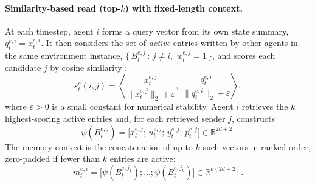 \documentclass{article}
\theoremstyle{plain}
\theoremstyle{definition}
\theoremstyle{remark}
\begin{document}

\paragraph{Similarity-based read (top-$k$) with fixed-length context.} At each timestep, agent $i$ forms a query vector from its own state summary, $q_t^{e,i}=x_t^{e,i}$.
It then considers the set of \emph{active} entries written by other agents in the same environment instance,
$\{\,B_t^{e,j}\,:\, j\neq i,\; w_t^{e,j}=1\,\}$, and scores each candidate $j$ by cosine similarity \cite{das2020tarmactargetedmultiagentcommunication}:
\[
s_t^{e}(i,j)=\left\langle
\frac{x_t^{e,j}}{\lVert x_t^{e,j}\rVert_2+\varepsilon},\;
\frac{q_t^{e,i}}{\lVert q_t^{e,i}\rVert_2+\varepsilon}
\right\rangle,
\]
where $\varepsilon>0$ is a small constant for numerical stability.
Agent $i$ retrieves the $k$ highest-scoring active entries and, for each retrieved sender $j$, constructs
\[
\psi(B_t^{e,j})=\big[x_t^{e,j};\,u_t^{e,j};\,y_t^{e,j};\,p_t^{e,j}\big]\in\mathbb{R}^{2d+2}.
\]
The memory context is the concatenation of up to $k$ such vectors in ranked order, zero-padded if fewer than $k$ entries are active:
\begin{equation}
m_t^{e,i}=\big[\psi(B_t^{e,j_1});\dots;\psi(B_t^{e,j_k})\big]\in\mathbb{R}^{k(2d+2)}.
\label{eq:memctx}
\end{equation}
\end{document}
